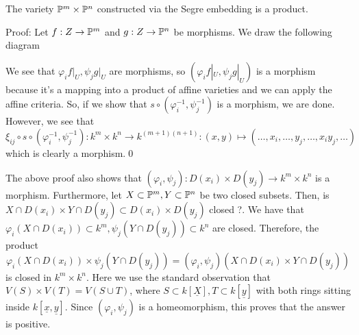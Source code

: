 \begin{dang}
    \begin{lemma}
        The variety $\mathbb{P}^m\times \mathbb{P}^n$ constructed via the Segre embedding is a product.
    \end{lemma}
\end{dang}
Proof: Let $f:Z\to \mathbb{P}^m$ and $g:Z\to \mathbb{P}^n$ be morphisms. 
We draw the following diagram
\begin{center}
\end{center} 
We see that $\varphi_if\big|_U, \psi_jg\big|_U$ are morphisms, so $(\varphi_i f|_U,\psi_j g|_U)$ is a 
morphism because it's a mapping into a product of affine varieties and we can apply the affine criteria. So, if we show that 
$s\circ (\varphi_i^{-1},\psi_j^{-1})$ is a morphism, we are done. However, we see that 
\begin{equation}
    \xi_{ij}\circ s \circ(\varphi_i^{-1},\psi_j^{-1}):k^m\times k^n\rightarrow k^{(m+1)(n+1)}:
    (x,y)\mapsto (\dots, x_i,\dots, y_j,\dots, x_iy_j,\dots)
\end{equation}
which is clearly a morphism.\qed 

\begin{remark}
    The above proof also shows that $(\varphi_i,\psi_j):D(x_i)\times D(y_j)\to k^m\times k^n$ is a morphism. Furthermore, 
    let $X\subset\mathbb{P}^m, Y\subset\mathbb{P}^n$ be two closed subsets. Then, is 
    $X\cap D(x_i) \times Y\cap D(y_j)\subset D(x_i)\times D(y_j)$ closed ?. We have that 
    $\varphi_i(X\cap D(x_i))\subset k^m, \psi_j(Y\cap D(y_j))\subset k^n$ are closed. Therefore, the product
    \begin{equation}
        \varphi_i(X\cap D(x_i))\times \psi_j(Y\cap D(y_j)) = (\varphi_i,\psi_j)(X\cap D(x_i) \times Y\cap D(y_j))
    \end{equation}
    is closed in $k^m\times k^n$. Here we use the standard observation that $V(S)\times V(T) = V(S\cup T)$, where 
    $S\subset k[\underline{X}], T\subset k[\underline{y}]$ with both rings sitting inside $k[\underline{x},\underline{y}]$. 
    Since $(\varphi_i,\psi_j)$ is a homeomorphism, this proves that the answer is positive.
\end{remark}

